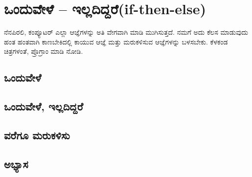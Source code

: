 \chapter{ಒಂದುವೇಳೆ – ಇಲ್ಲದಿದ್ದರೆ(\textenglish{if-then-else})}
ನೆನಪಿರಲಿ, ಕಂಪ್ಯೂಟರ್ ಎಲ್ಲಾ ಆಜ್ಞೆಗಳನ್ನು ಅತಿ ವೇಗವಾಗಿ ಮಾಡಿ ಮುಗಿಸುತ್ತದೆ. ನಮಗೆ ಅದು ಕೆಲಸ ಮಾಡುವುದು ಹಂತ ಹಂತವಾಗಿ ಕಾಣಬೇಕಿದಲ್ಲಿ ಕಾಯುವ ಆಜ್ಞೆ ಮತ್ತು ಮರುಕಳಿಸುವ ಆಜ್ಞೆಗಳನ್ನು ಬಳಸಬೇಕು. ಕೆಳಕಂಡ ಚಿತ್ರಗಳಂತೆ, ಪ್ರೊಗ್ರಾಂ ಮಾಡಿ ನೋಡಿ. 
\section{ಒಂದುವೇಳೆ}

\section{ಒಂದುವೇಳೆ, ಇಲ್ಲದಿದ್ದರೆ}
\SampleProgram
\section{ವರೆಗೂ ಮರುಕಳಿಸು} 

\section{ಅಭ್ಯಾಸ }